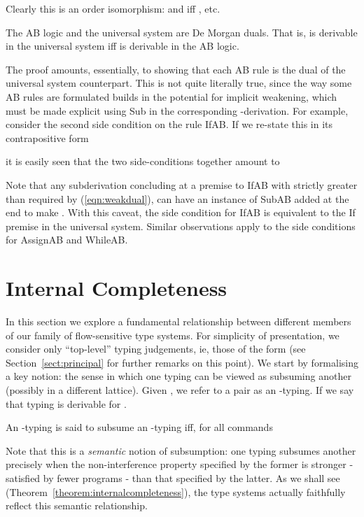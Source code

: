 \documentclass{sigplanconf}
\begin{document}
\begin{table}
Clearly this is an order isomorphism:  and  iff
, etc.
\begin{theorem}
    The AB logic and the universal system are De Morgan duals. That is,
     is derivable in the universal system iff
     is derivable in the AB logic.
\end{theorem}
The proof amounts, essentially, to showing that each AB rule is the dual of the universal system
counterpart.
This is not quite literally true, since the way some AB rules are formulated builds in
the potential for implicit weakening,
which must be made explicit using Sub in the corresponding -derivation.
For example, consider the second side condition on the rule IfAB.
If we re-state this in its contrapositive form

it is easily seen that the two side-conditions together amount to

Note that any subderivation concluding
at a premise to
IfAB with  strictly greater than required by (\ref{eqn:weakdual}),
can have an instance of SubAB added at the end to make
.
With this caveat, the side condition for IfAB is equivalent to
the If premise in the universal system.
Similar observations apply to the side conditions for AssignAB and WhileAB.

\section{Internal Completeness}\label{sect:completeness}
In this section we explore a fundamental relationship between different members of our
family of flow-sensitive type systems.
For simplicity of presentation, we consider only ``top-level'' typing judgements, ie, those
of the form  (see Section~\ref{sect:principal} for further remarks
on this point).
We start by formalising a key notion: the sense in which one typing
can be viewed as subsuming another
(possibly in a different lattice).
Given ,
we refer to a pair  as an -typing.
If  we say that typing  is derivable for .
\begin{definition}
    An -typing  is said to subsume
    an -typing  iff, for all commands 
    
\end{definition}
Note that this is a \emph{semantic} notion of subsumption: one typing subsumes another
precisely when the non-interference property specified by the former is stronger - satisfied
by fewer programs - than that specified by the latter.
As we shall see (Theorem~\ref{theorem:internalcompleteness}),
the type systems actually faithfully reflect this semantic relationship.


\end{table}
\end{document}
